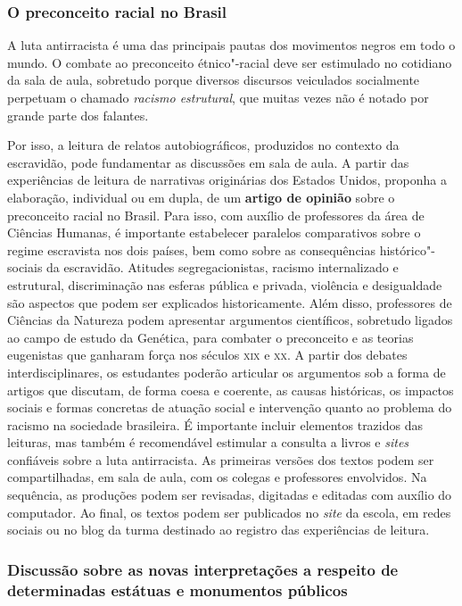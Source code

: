\documentclass[12pt]{extarticle}
\begin{document}
\subsubsection{O preconceito racial no Brasil}

A luta antirracista é uma das principais pautas dos movimentos negros
em todo o mundo. O combate ao preconceito étnico"-racial deve ser
estimulado no cotidiano da sala de aula, sobretudo porque diversos
discursos veiculados socialmente perpetuam o chamado \emph{racismo
estrutural}, que muitas vezes não é notado por grande parte dos
falantes. 


Por isso, a leitura de relatos autobiográficos, produzidos
no contexto da escravidão, pode fundamentar as discussões em sala de
aula. A partir das experiências de leitura de narrativas originárias
dos Estados Unidos, proponha a elaboração, individual ou em dupla, de
um \textbf{artigo de opinião} sobre o preconceito racial no Brasil.
Para isso, com auxílio de professores da área de Ciências Humanas, é
importante estabelecer paralelos comparativos sobre o regime
escravista nos dois países, bem como sobre as consequências
histórico"-sociais da escravidão. Atitudes segregacionistas, racismo
internalizado e estrutural, discriminação nas esferas pública e
privada, violência e desigualdade são aspectos que podem ser
explicados historicamente. Além disso, professores de Ciências da
Natureza podem apresentar argumentos científicos, sobretudo ligados ao
campo de estudo da Genética, para combater o preconceito e as teorias
eugenistas que ganharam força nos séculos \textsc{xix} e \textsc{xx}. A partir dos
debates interdisciplinares, os estudantes poderão articular os
argumentos sob a forma de artigos que discutam, de forma coesa e
coerente, as causas históricas, os impactos sociais e formas concretas
de atuação social e intervenção quanto ao problema do racismo na
sociedade brasileira. É importante incluir elementos trazidos das
leituras, mas também é recomendável estimular a consulta a livros e
\emph{sites} confiáveis sobre a luta antirracista. As primeiras
versões dos textos podem ser compartilhadas, em sala de aula, com os
colegas e professores envolvidos. Na sequência, as produções podem ser
revisadas, digitadas e editadas com auxílio do computador. Ao final,
os textos podem ser publicados no \emph{site} da escola, em redes
sociais ou no blog da turma destinado ao registro das experiências de
leitura.

\subsubsection{Discussão sobre as novas interpretações 
a respeito de determinadas estátuas e monumentos públicos}
\end{document}
